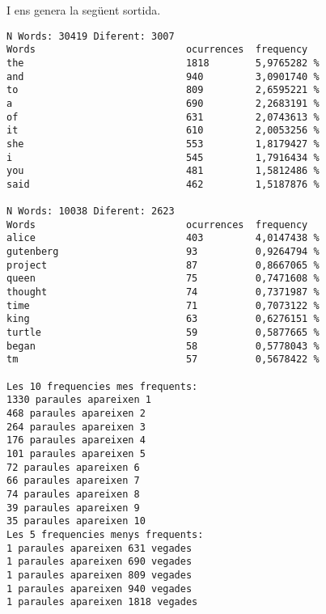 \documentclass{report}
\begin{document}
\newpage

I ens genera la següent sortida. \\

\begin{verbatim}
N Words: 30419 Diferent: 3007
Words                          ocurrences  frequency
the                            1818        5,9765282 %
and                            940         3,0901740 %
to                             809         2,6595221 %
a                              690         2,2683191 %
of                             631         2,0743613 %
it                             610         2,0053256 %
she                            553         1,8179427 %
i                              545         1,7916434 %
you                            481         1,5812486 %
said                           462         1,5187876 %

N Words: 10038 Diferent: 2623
Words                          ocurrences  frequency
alice                          403         4,0147438 %
gutenberg                      93          0,9264794 %
project                        87          0,8667065 %
queen                          75          0,7471608 %
thought                        74          0,7371987 %
time                           71          0,7073122 %
king                           63          0,6276151 %
turtle                         59          0,5877665 %
began                          58          0,5778043 %
tm                             57          0,5678422 %

Les 10 frequencies mes frequents:
1330 paraules apareixen 1
468 paraules apareixen 2
264 paraules apareixen 3
176 paraules apareixen 4
101 paraules apareixen 5
72 paraules apareixen 6
66 paraules apareixen 7
74 paraules apareixen 8
39 paraules apareixen 9
35 paraules apareixen 10
Les 5 frequencies menys frequents:
1 paraules apareixen 631 vegades
1 paraules apareixen 690 vegades
1 paraules apareixen 809 vegades
1 paraules apareixen 940 vegades
1 paraules apareixen 1818 vegades
\end{verbatim}

\newpage
\end{document}
